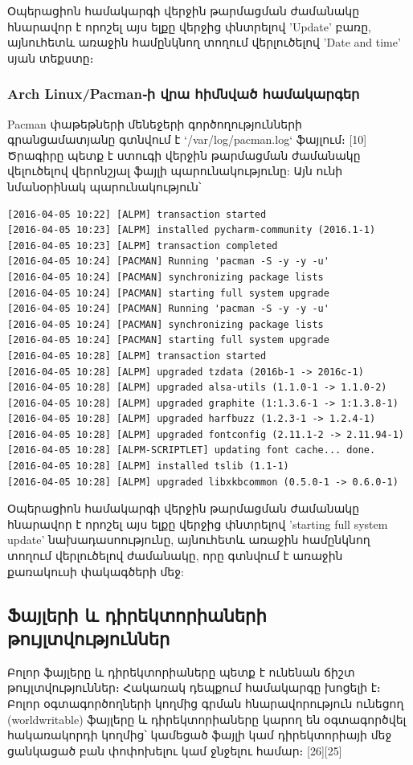 \documentclass[12pt]{article}
\begin{document}
\begin{sloppypar}
Օպերացիոն համակարգի վերջին թարմացման ժամանակը հնարավոր է որոշել
այս ելքը վերջից փնտրելով 'Update' բառը, այնուհետև
առաջին համընկնող տողում վերլուծելով 'Date and time' սյան տեքստը։

\subsubsection{Arch Linux/Pacman֊ի վրա հիմնված համակարգեր}

Pacman փաթեթների մենեջերի գործողությունների գրանցամատյանը
գտնվում է `/var/log/pacman.log` ֆայլում։ [10] Ծրագիրը պետք է ստուգի
վերջին թարմացման ժամանակը վելուծելով վերոնշյալ ֆայլի պարունակությունը:
Այն ունի նմանօրինակ պարունակություն՝

\begin{lstlisting}[language={}]
[2016-04-05 10:22] [ALPM] transaction started
[2016-04-05 10:23] [ALPM] installed pycharm-community (2016.1-1)
[2016-04-05 10:23] [ALPM] transaction completed
[2016-04-05 10:24] [PACMAN] Running 'pacman -S -y -y -u'
[2016-04-05 10:24] [PACMAN] synchronizing package lists
[2016-04-05 10:24] [PACMAN] starting full system upgrade
[2016-04-05 10:24] [PACMAN] Running 'pacman -S -y -y -u'
[2016-04-05 10:24] [PACMAN] synchronizing package lists
[2016-04-05 10:24] [PACMAN] starting full system upgrade
[2016-04-05 10:28] [ALPM] transaction started
[2016-04-05 10:28] [ALPM] upgraded tzdata (2016b-1 -> 2016c-1)
[2016-04-05 10:28] [ALPM] upgraded alsa-utils (1.1.0-1 -> 1.1.0-2)
[2016-04-05 10:28] [ALPM] upgraded graphite (1:1.3.6-1 -> 1:1.3.8-1)
[2016-04-05 10:28] [ALPM] upgraded harfbuzz (1.2.3-1 -> 1.2.4-1)
[2016-04-05 10:28] [ALPM] upgraded fontconfig (2.11.1-2 -> 2.11.94-1)
[2016-04-05 10:28] [ALPM-SCRIPTLET] updating font cache... done.
[2016-04-05 10:28] [ALPM] installed tslib (1.1-1)
[2016-04-05 10:28] [ALPM] upgraded libxkbcommon (0.5.0-1 -> 0.6.0-1)
\end{lstlisting}

Օպերացիոն համակարգի վերջին թարմացման ժամանակը հնարավոր է որոշել
այս ելքը վերջից փնտրելով 'starting full system update' նախադասոությունը,
այնուհետև առաջին համընկնող տողում վերլուծելով ժամանակը, որը գտնվում է
առաջին քառակուսի փակագծերի մեջ:


\subsection{Ֆայլերի և դիրեկտորիաների թույլտվություններ}


Բոլոր ֆայլերը և դիրեկտորիաները պետք է ունենան ճիշտ թույլտվություններ։
Հակառակ դեպքում համակարգը խոցելի է։
Բոլոր օգտագործողների կողմից գրման հնարավորություն ունեցող (worldwritable)
ֆայլերը և դիրեկտորիաները կարող են օգտագործվել հակառակորդի կողմից՝
կամեցած ֆայլի կամ դիրեկտորիայի մեջ ցանկացած բան փոփոխելու կամ ջնջելու
համար։ [26][25]


\end{sloppypar}
\end{document}
